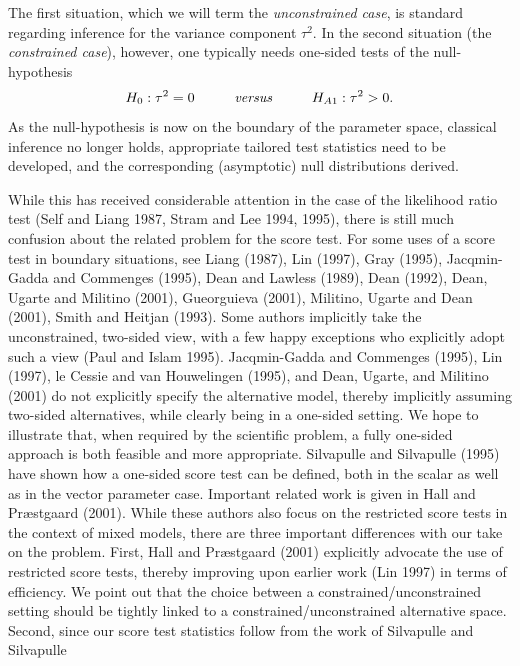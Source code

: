 \documentclass[useAMS,usenatbib,referee]{biom}
\begin{document}
The first situation, which we will term the {\em unconstrained
case\/}, is standard regarding inference for the variance component
$\tau^2$. In the second situation (the {\em constrained case\/}),
however, one typically needs one-sided tests of the null-hypothesis
\begin{equation}
\label{onesided}
H_0:\tau^2=0 \hspace*{1cm} \mbox{\em versus} \hspace*{1cm} H_{A1}:\tau^2 > 0.
\end{equation}
As the null-hypothesis is now on the boundary of the parameter space,
classical inference no longer holds, appropriate tailored test
statistics need to be developed, and the corresponding (asymptotic)
null distributions derived.

While this has received considerable attention in the case of the
likelihood ratio test (Self and Liang 1987, Stram and Lee 1994, 1995),
there is still much confusion about the related problem for the score
test.  For some uses of a score test in boundary situations, see Liang
(1987), Lin (1997), Gray (1995), Jacqmin-Gadda and Commenges (1995),
Dean and Lawless (1989), Dean (1992), Dean, Ugarte and Militino
(2001), Gueorguieva (2001), Militino, Ugarte and Dean (2001), Smith
and Heitjan (1993). Some authors implicitly take the unconstrained,
two-sided view, with a few happy exceptions who explicitly adopt such
a view (Paul and Islam 1995).  Jacqmin-Gadda and Commenges (1995), Lin
(1997), le Cessie and van Houwelingen (1995), and Dean, Ugarte, and
Militino (2001) do not explicitly specify the alternative model,
thereby implicitly assuming two-sided alternatives, while clearly
being in a one-sided setting. We hope to illustrate that, when
required by the scientific problem, a fully one-sided approach is both
feasible and more appropriate.  Silvapulle and Silvapulle (1995) have
shown how a one-sided score test can be defined, both in the scalar as
well as in the vector parameter case. Important related work is given
in Hall and Pr{\ae}stgaard (2001). While these authors also focus on
the restricted score tests in the context of mixed models, there are
three important differences with our take on the problem. First, Hall
and Pr{\ae}stgaard (2001) explicitly advocate the use of restricted
score tests, thereby improving upon earlier work (Lin 1997) in terms
of efficiency. We point out that the choice between a
constrained/unconstrained setting should be tightly linked to a
constrained/unconstrained alternative space.  Second, since our score
test statistics follow from the work of Silvapulle and Silvapulle
\end{document}
